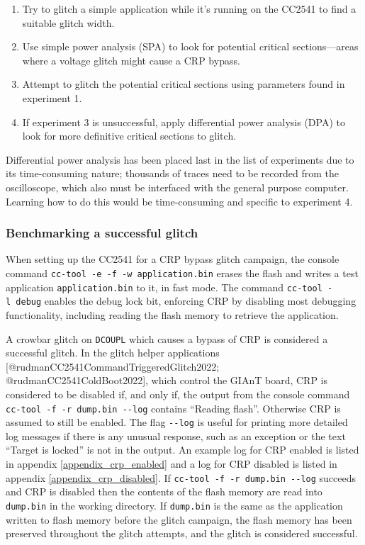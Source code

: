 \begin{enumerate}
\def\labelenumi{\arabic{enumi}.}
\tightlist
\item
  Try to glitch a simple application while it's running on the CC2541 to
  find a suitable glitch width.
\item
  Use simple power analysis (SPA) to look for potential critical
  sections---areas where a voltage glitch might cause a CRP bypass.
\item
  Attempt to glitch the potential critical sections using parameters
  found in experiment 1.
\item
  If experiment 3 is unsuccessful, apply differential power analysis
  (DPA) to look for more definitive critical sections to glitch.
\end{enumerate}

Differential power analysis has been placed last in the list of
experiments due to its time-consuming nature; thousands of traces need
to be recorded from the oscilloscope, which also must be interfaced with
the general purpose computer. Learning how to do this would be
time-consuming and specific to experiment 4.

\hypertarget{benchmarking-a-successful-glitch-1}{%
\subsubsection{Benchmarking a successful
glitch}\label{benchmarking-a-successful-glitch-1}}

When setting up the CC2541 for a CRP bypass glitch campaign, the console
command \texttt{cc-tool\ -e\ -f\ -w\ application.bin} erases the flash
and writes a test application \texttt{application.bin} to it, in fast
mode. The command \texttt{cc-tool\ -l\ debug} enables the debug lock
bit, enforcing CRP by disabling most debugging functionality, including
reading the flash memory to retrieve the application.

A crowbar glitch on \texttt{DCOUPL} which causes a bypass of CRP is
considered a successful glitch. In the glitch helper applications
{[}@rudmanCC2541CommandTriggeredGlitch2022;
@rudmanCC2541ColdBoot2022{]}, which control the GIAnT board, CRP is
considered to be disabled if, and only if, the output from the console
command \texttt{cc-tool\ -f\ -r\ dump.bin\ -\/-log} contains ``Reading
flash''. Otherwise CRP is assumed to still be enabled. The flag
\texttt{-\/-log} is useful for printing more detailed log messages if
there is any unusual response, such as an exception or the text ``Target
is locked'' is not in the output. An example log for CRP enabled is
listed in appendix \ref{appendix_crp_enabled} and a log for CRP disabled
is listed in appendix \ref{appendix_crp_disabled}. If
\texttt{cc-tool\ -f\ -r\ dump.bin\ -\/-log} succeeds and CRP is disabled
then the contents of the flash memory are read into \texttt{dump.bin} in
the working directory. If \texttt{dump.bin} is the same as the
application written to flash memory before the glitch campaign, the
flash memory has been preserved throughout the glitch attempts, and the
glitch is considered successful.

